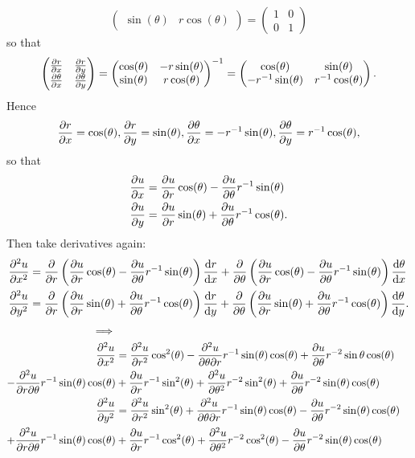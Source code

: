 \documentclass[11pt]{article}
\newcommand{\br}[1]{\left(#1\right)}
\begin{document}
\[\begin{pmatrix}
  \sin(\theta) & r\cos(\theta)
\end{pmatrix} = \begin{pmatrix}
  1 & 0 \\ 0 & 1
\end{pmatrix}\] so that \[\begin{pmatrix}
  \pdv{r}{x} & \pdv{r}{y} \\ 
  \pdv{\theta}{x} & \pdv{\theta}{y}
\end{pmatrix} = \begin{pmatrix}
  \cos(\theta) & -r\sin(\theta) \\
  \sin(\theta) & r\cos(\theta)
\end{pmatrix}^{-1} = \begin{pmatrix}
  \cos(\theta) & \sin(\theta) \\
  -r^{-1}\sin(\theta) & r^{-1}\cos(\theta)
\end{pmatrix}.\] Hence \[
  \pdv{r}{x} = \cos(\theta),
  \pdv{r}{y} = \sin(\theta),
  \pdv{\theta}{x} = -r^{-1}\sin(\theta),
  \pdv{\theta}{y} = r^{-1}\cos(\theta),
\] so that \begin{align*}\pdv{u}{x} &= \pdv{u}{r}\cos(\theta) - \pdv{u}{\theta}r^{-1}\sin(\theta) \\ \pdv{u}{y} &= \pdv{u}{r}\sin(\theta) + \pdv{u}{\theta}r^{-1}\cos(\theta).\end{align*} Then take derivatives again: \begin{align*}\pdv[2]{u}{x} &= \pdv{r}\br{\pdv{u}{r}\cos(\theta) - \pdv{u}{\theta}r^{-1}\sin(\theta)}\dv{r}{x} + \pdv{\theta}\br{\pdv{u}{r}\cos(\theta) - \pdv{u}{\theta}r^{-1}\sin(\theta)}\dv{\theta}{x} \\ \pdv[2]{u}{y} &= \pdv{r}\br{\pdv{u}{r}\sin(\theta) + \pdv{u}{\theta}r^{-1}\cos(\theta)}\dv{r}{y} + \pdv{\theta}\br{\pdv{u}{r}\sin(\theta) + \pdv{u}{\theta}r^{-1}\cos(\theta)}\dv{\theta}{y}.\end{align*} \begin{align*}
  \implies \\
  \pdv[2]{u}{x} &= \pdv[2]{u}{r}\cos^2(\theta)-\pdv[2]{u}{\theta}{r}r^{-1}\sin(\theta)\cos(\theta)+\pdv{u}{\theta}r^{-2}\sin{\theta}\cos(\theta)\\
  - \pdv[2]{u}{r}{\theta}r^{-1}\sin(\theta)\cos(\theta) &+ \pdv{u}{r}r^{-1}\sin^2(\theta) + \pdv[2]{u}{\theta}r^{-2}\sin^2(\theta) +\pdv{u}{\theta}r^{-2}\sin(\theta)\cos(\theta)\\
  \pdv[2]{u}{y} &= \pdv[2]{u}{r}\sin^2(\theta) + \pdv[2]{u}{\theta}{r}r^{-1}\sin(\theta)\cos(\theta)-\pdv{u}{\theta}r^{-2}\sin(\theta)\cos(\theta)\\
  +\pdv[2]{u}{r}{\theta}r^{-1}\sin(\theta)\cos(\theta) &+ \pdv{u}{r}r^{-1}\cos^2(\theta) + \pdv[2]{u}{\theta}r^{-2}\cos^2(\theta) - \pdv{u}{\theta}r^{-2}\sin(\theta)\cos(\theta)\\
\end{align*}
\end{document}

